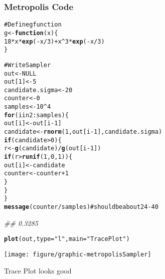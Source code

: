 \documentclass[12pt,letterpaper,oneside]{article}\usepackage{graphicx, color}
\makeatletter
\newcommand{\hlfunctioncall}[1]{\textcolor[rgb]{0.501960784313725,0,0.329411764705882}{\textbf{#1}}}%
\newcommand{\hlstring}[1]{\textcolor[rgb]{0.6,0.6,1}{#1}}%
\newcommand{\hlcomment}[1]{\textcolor[rgb]{0.180392156862745,0.6,0.341176470588235}{#1}}%
\newenvironment{kframe}{%
 \def\at@end@of@kframe{}%
 \ifinner\ifhmode%
  \def\at@end@of@kframe{\end{minipage}}%
  \begin{minipage}{\columnwidth}%
 \fi\fi%
 \def\FrameCommand##1{\hskip\@totalleftmargin \hskip-\fboxsep
 \colorbox{shadecolor}{##1}\hskip-\fboxsep
     \hskip-\linewidth \hskip-\@totalleftmargin \hskip\columnwidth}%
 \MakeFramed {\advance\hsize-\width
   \@totalleftmargin\z@ \linewidth\hsize
   \@setminipage}}%
 {\par\unskip\endMakeFramed%
 \at@end@of@kframe}
\newenvironment{knitrout}{}{} %
\makeatother
\begin{document}
\subsubsection{Metropolis Code} %
\label{ssub:metropolis_code}
\begin{knitrout}\scriptsize
{}\color{fgcolor}\begin{kframe}
\begin{alltt}
\hlcomment{# Define g function}
g <- \hlfunctioncall{function}(x) \{
    18 * x * \hlfunctioncall{exp}(-x/3) + x^3 * \hlfunctioncall{exp}(-x/3)
\}

\hlcomment{# Write Sampler}
out <- NULL
out[1] <- 5
candidate.sigma <- 20
counter <- 0
samples <- 10^4
\hlfunctioncall{for} (i in 2:samples) \{
    out[i] <- out[i - 1]
    candidate <- \hlfunctioncall{rnorm}(1, out[i - 1], candidate.sigma)
    \hlfunctioncall{if} (candidate > 0) \{
        r <- \hlfunctioncall{g}(candidate)/\hlfunctioncall{g}(out[i - 1])
        \hlfunctioncall{if} (r > \hlfunctioncall{runif}(1, 0, 1)) \{
            out[i] <- candidate
            counter <- counter + 1
        \}
    \}
\}
\hlfunctioncall{message}(counter/samples)  \hlcomment{# should be about 24-40}
\end{alltt}


{\ttfamily\noindent\itshape\textcolor{messagecolor}{\#\# 0.3285}}\begin{alltt}
\hlfunctioncall{plot}(out, type = \hlstring{"l"}, main = \hlstring{"Trace Plot"})
\end{alltt}
\end{kframe}

{\centering \texttt{[image: figure/graphic-metropolisSampler]} 

}



\end{knitrout}

Trace Plot looks good
\end{document}
